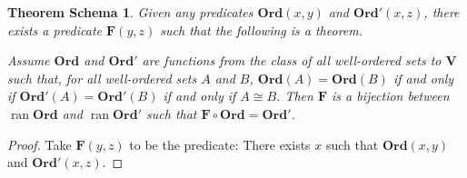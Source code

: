 \documentclass{report}
\newtheorem{thms}[axiom]{Theorem Schema}
\theoremstyle{definition}
\newcommand{\ran}{\ensuremath{\operatorname{ran}}}
\begin{document}
    \begin{thms}
        Given any predicates $\mathbf{Ord}(x,y)$ and $\mathbf{Ord}'(x,z)$, there exists a predicate
        $\mathbf{F}(y,z)$ such that the following is a theorem.
        
        Assume $\mathbf{Ord}$ and $\mathbf{Ord}'$ are functions from the class of all well-ordered sets to
        $\mathbf{V}$ such that, for all well-ordered sets $A$ and $B$, $\mathbf{Ord}(A) = \mathbf{Ord}(B)$
        if and only if $\mathbf{Ord}'(A) = \mathbf{Ord}'(B)$ if and only if $A \cong B$. Then $\mathbf{F}$ is
        a bijection between $\ran \mathbf{Ord}$
        and $\ran \mathbf{Ord}'$ such that $\mathbf{F} \circ \mathbf{Ord} = \mathbf{Ord}'$.
    \end{thms}

    \begin{proof}
        Take $\mathbf{F}(y,z)$ to be the predicate: There exists $x$ such that $\mathbf{Ord}(x,y)$ and
        $\mathbf{Ord}'(x,z)$.


\end{proof}
\end{document}
